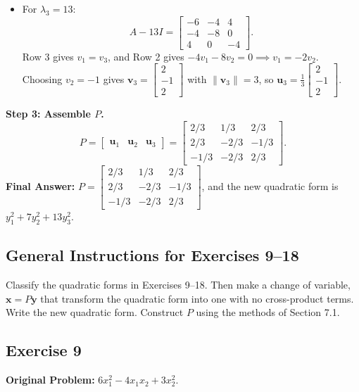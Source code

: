 \documentclass[11pt, letterpaper]{article}
\theoremstyle{definition}
\theoremstyle{remark}
\begin{document}
\begin{itemize}
    \item For $\lambda_3 = 13$:
    \[
    A - 13I = \begin{bmatrix} -6 & -4 & 4 \\ -4 & -8 & 0 \\ 4 & 0 & -4 \end{bmatrix}.
    \]
    Row 3 gives $v_1 = v_3$, and Row 2 gives $-4v_1 - 8v_2 = 0 \implies v_1 = -2v_2$. Choosing $v_2 = -1$ gives $\mathbf{v}_3 = \begin{bmatrix} 2 \\ -1 \\ 2 \end{bmatrix}$ with $\|\mathbf{v}_3\| = 3$, so $\mathbf{u}_3 = \frac{1}{3}\begin{bmatrix} 2 \\ -1 \\ 2 \end{bmatrix}$.
\end{itemize}
\textbf{Step 3: Assemble $P$.}
\[
P = \begin{bmatrix} \mathbf{u}_1 & \mathbf{u}_2 & \mathbf{u}_3 \end{bmatrix} = \begin{bmatrix} 2/3 & 1/3 & 2/3 \\ 2/3 & -2/3 & -1/3 \\ -1/3 & -2/3 & 2/3 \end{bmatrix}.
\]
\textbf{Final Answer:} $P = \begin{bmatrix} 2/3 & 1/3 & 2/3 \\ 2/3 & -2/3 & -1/3 \\ -1/3 & -2/3 & 2/3 \end{bmatrix}$, and the new quadratic form is $y_1^2 + 7y_2^2 + 13y_3^2$.

\hrulefill

\subsection*{General Instructions for Exercises 9--18}
Classify the quadratic forms in Exercises 9--18. Then make a change of variable, $\mathbf{x} = P\mathbf{y}$ that transform the quadratic form into one with no cross-product terms. Write the new quadratic form. Construct $P$ using the methods of Section 7.1.

\subsection*{Exercise 9}
\textbf{Original Problem:} $6x_1^2 - 4x_1x_2 + 3x_2^2$.
\end{document}
